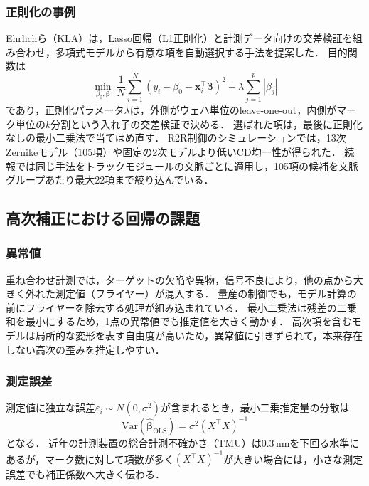 \documentclass[11pt,a4paper]{ltjsarticle}
\begin{document}
\subsubsection{正則化の事例}

Ehrlichら（KLA）は，Lasso回帰（L1正則化）\cite{Tibshirani1996}と計測データ向けの交差検証を組み合わせ，多項式モデルから有意な項を自動選択する手法を提案した\cite{Ehrlich2025}．
目的関数は
\begin{equation}
  \min_{\beta_0,\bm\beta}\ \frac{1}{N}\sum_{i=1}^{N}\left(y_i-\beta_0-\bm x_i^\top\bm\beta\right)^2+\lambda\sum_{j=1}^{p}|\beta_j|
  \label{eq:lasso_ehrlich}
\end{equation}
であり，正則化パラメータ$\lambda$は，外側がウェハ単位のleave-one-out，内側がマーク単位の$k$分割という入れ子の交差検証で決める．
選ばれた項は，最後に正則化なしの最小二乗法で当てはめ直す．
R2R制御のシミュレーションでは，13次Zernikeモデル（105項）や固定の2次モデルより低いCD均一性が得られた．
続報では同じ手法をトラックモジュールの文脈ごとに適用し，105項の候補を文脈グループあたり最大22項まで絞り込んでいる\cite{Ehrlich2026}．

\subsection{高次補正における回帰の課題}

\subsubsection{異常値}

重ね合わせ計測では，ターゲットの欠陥や異物，信号不良により，他の点から大きく外れた測定値（フライヤー）が混入する．
量産の制御でも，モデル計算の前にフライヤーを除去する処理が組み込まれている\cite{Lee2017}．
最小二乗法は残差の二乗和を最小にするため，1点の異常値でも推定値を大きく動かす．
高次項を含むモデルは局所的な変形を表す自由度が高いため，異常値に引きずられて，本来存在しない高次の歪みを推定しやすい．

\subsubsection{測定誤差}

測定値に独立な誤差$\varepsilon_i\sim N(0,\sigma^2)$が含まれるとき，最小二乗推定量の分散は
\begin{equation}
  \mathrm{Var}(\hat{\bm\beta}_{\mathrm{OLS}})=\sigma^2(X^\top X)^{-1}
  \label{eq:var}
\end{equation}
となる．
近年の計測装置の総合計測不確かさ（TMU）は0.3\,nmを下回る水準にあるが\cite{Klein2026}，マーク数に対して項数が多く$(X^\top X)^{-1}$が大きい場合には，小さな測定誤差でも補正係数へ大きく伝わる．
\end{document}

